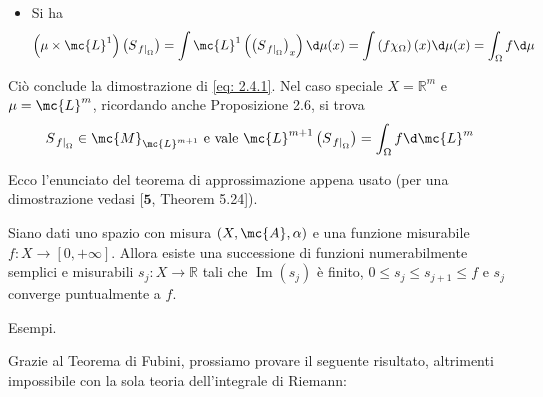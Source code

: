 \begin{oss}
\begin{itemize}
        \item Si ha
        \[\left(\mu \times \mc{L}^{1}\right)\left(S_{\left.f\right|_{\Omega}}\right)=\int \mc{L}^{1}\left(\left(S_{\left.f\right|_{\Omega}}\right)_{x}\right) \d \mu(x)=\int\left(f \chi_{\Omega}\right)(x) \d \mu(x)=\int_{\Omega} f \d \mu\]
    \end{itemize}
    Ciò conclude la dimostrazione di \eqref{eq: 2.4.1}. Nel caso speciale $X=\mathbb{R}^{m}$ e $\mu=\mc{L}^{m}$, ricordando anche Proposizione 2.6, si trova
    \[S_{\left.f\right|_{\Omega}} \in \mc{M}_{\mc{L}^{m+1}} \text { e vale } \mc{L}^{m+1}\left(S_{\left.f\right|_{\Omega}}\right)=\int_{\Omega} f \d \mc{L}^{m}\]
\end{oss}

Ecco l'enunciato del teorema di approssimazione appena usato (per una dimostrazione vedasi $[\mathbf{5}$, Theorem 5.24]).


\begin{proposition}\label{prop: 2.7}
    Siano dati uno spazio con misura $(X, \mc{A}, \alpha)$ e una funzione misurabile $f: X \rightarrow[0,+\infty]$. Allora esiste una successione di funzioni numerabilmente semplici e misurabili $s_{j}: X \rightarrow \mathbb{R}$ tali che $\operatorname{Im}\left(s_{j}\right)$ è finito, $0 \leq s_{j} \leq s_{j+1} \leq f$ e $s_{j}$ converge puntualmente a $f$.
\end{proposition}\label{prop: 2.7}

Esempi.

Grazie al Teorema di Fubini, prossiamo provare il seguente risultato, altrimenti impossibile con la sola teoria dell'integrale di Riemann:

